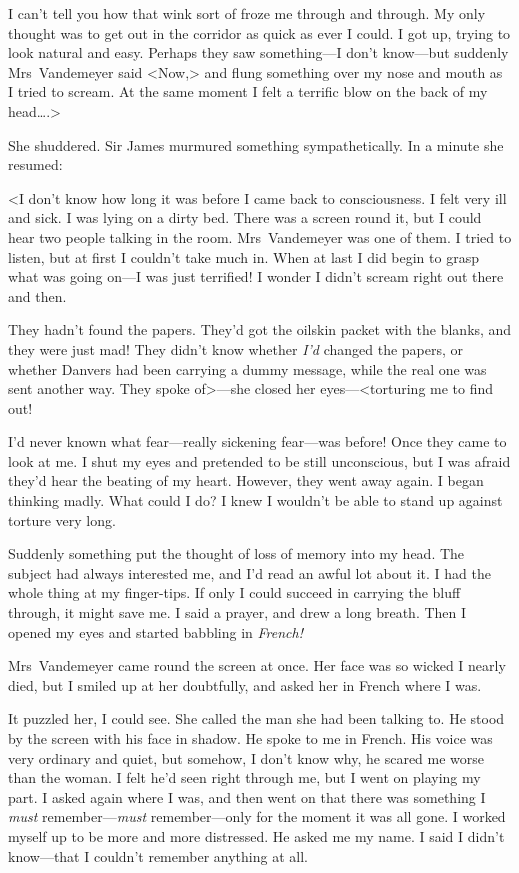 I can't tell you how that wink sort of froze me through and through. My only thought was to get out in the corridor as quick as ever I could. I got up, trying to look natural and easy. Perhaps they saw something—I don't know—but suddenly Mrs~Vandemeyer said <Now,> and flung something over my nose and mouth as I tried to scream. At the same moment I felt a terrific blow on the back of my head\dots.>

She shuddered. Sir James murmured something sympathetically. In a minute she resumed:

<I don't know how long it was before I came back to consciousness. I felt very ill and sick. I was lying on a dirty bed. There was a screen round it, but I could hear two people talking in the room. Mrs~Vandemeyer was one of them. I tried to listen, but at first I couldn't take much in. When at last I did begin to grasp what was going on—I was just terrified! I wonder I didn't scream right out there and then.

They hadn't found the papers. They'd got the oilskin packet with the blanks, and they were just mad! They didn't know whether \emph{I'd} changed the papers, or whether Danvers had been carrying a dummy message, while the real one was sent another way. They spoke of>—she closed her eyes—<torturing me to find out!

I'd never known what fear—really sickening fear—was before! Once they came to look at me. I shut my eyes and pretended to be still unconscious, but I was afraid they'd hear the beating of my heart. However, they went away again. I began thinking madly. What could I do? I knew I wouldn't be able to stand up against torture very long.

Suddenly something put the thought of loss of memory into my head. The subject had always interested me, and I'd read an awful lot about it. I had the whole thing at my finger-tips. If only I could succeed in carrying the bluff through, it might save me. I said a prayer, and drew a long breath. Then I opened my eyes and started babbling in \textit{French!}

Mrs~Vandemeyer came round the screen at once. Her face was so wicked I nearly died, but I smiled up at her doubtfully, and asked her in French where I was.

It puzzled her, I could see. She called the man she had been talking to. He stood by the screen with his face in shadow. He spoke to me in French. His voice was very ordinary and quiet, but somehow, I don't know why, he scared me worse than the woman. I felt he'd seen right through me, but I went on playing my part. I asked again where I was, and then went on that there was something I \textit{must} remember—\textit{must} remember—only for the moment it was all gone. I worked myself up to be more and more distressed. He asked me my name. I said I didn't know—that I couldn't remember anything at all.

